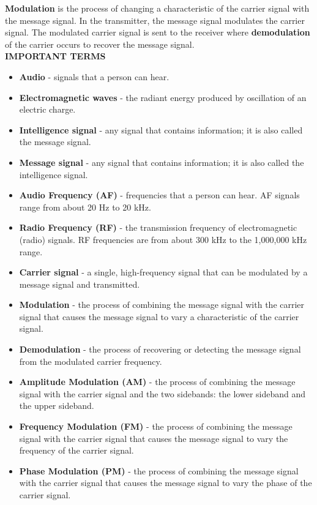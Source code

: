 \textbf{Modulation} is the process of changing a characteristic of the carrier signal with the message
signal. In the transmitter, the message signal modulates the carrier signal.
The modulated carrier signal is sent to the receiver where \textbf{demodulation} of the carrier occurs to
recover the message signal.\\[10pt]
\textsc{\textbf {IMPORTANT TERMS}}
\begin{itemize}
\item \textbf{Audio} - signals that a person can hear.

\item \textbf{Electromagnetic waves} - the radiant energy produced by oscillation of an electric
charge.

\item \textbf{Intelligence signal} - any signal that contains information; it is also called the
message signal.
\item \textbf{Message signal} - any signal that contains information; it is also called
the intelligence signal. 
\item \textbf{Audio Frequency (AF)} - frequencies that a person can hear.
AF signals range from about 20 Hz to 20 kHz.
\item \textbf{Radio Frequency (RF)} - the transmission frequency of electromagnetic (radio) signals.
RF frequencies are from about 300 kHz to the 1,000,000 kHz range.
\item \textbf{Carrier signal} - a single, high-frequency signal that can be modulated by a message
signal and transmitted.
\item \textbf{Modulation} - the process of combining the message signal with the carrier signal that
causes the message signal to vary a characteristic of the carrier signal.
\item \textbf{Demodulation} - the process of recovering or detecting the message signal from the
modulated carrier frequency.
\item \textbf{Amplitude Modulation (AM)} - the process of combining the message signal with
the carrier signal and the two sidebands: the lower sideband and the upper
sideband.
\item \textbf{Frequency Modulation (FM)} - the process of combining the message signal with
the carrier signal that causes the message signal to vary the frequency of the
carrier signal.
\item \textbf{Phase Modulation (PM)} - the process of combining the message signal with the
carrier signal that causes the message signal to vary the phase of the carrier signal.

\end{itemize}
